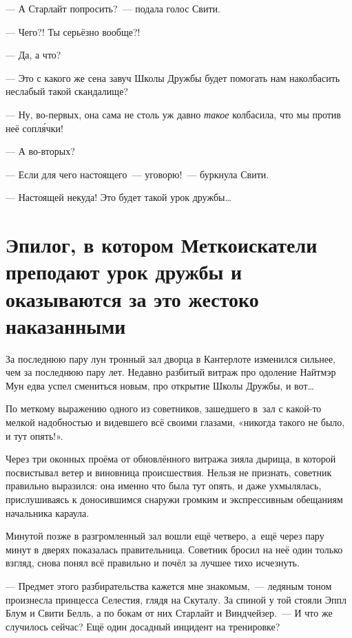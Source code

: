 \documentclass[fontsize=11pt,a5paper,titlepage=firstcover]{scrbook}
\begin{document}
--- А Старлайт попросить?~--- подала голос Свити.

--- Чего?! Ты серьёзно вообще?!

--- Да, а что?

--- Это с какого же сена завуч Школы Дружбы будет помогать нам наколбасить неслабый такой скандалище?

--- Ну, во-первых, она сама не столь уж давно \emph{такое} колбасила, что мы против неё сопля́чки!

--- А во-вторых?

--- Если для чего настоящего~--- уговорю!~--- буркнула Свити.

--- Настоящей некуда! Это будет такой урок дружбы{\ldots}




\chapter*{Эпилог, в котором Меткоискатели преподают урок дружбы и оказываются за это жестоко наказанными}


За последнюю пару лун тронный зал дворца в Кантерлоте изменился сильнее, чем за последнюю пару лет. Недавно разбитый витраж про одоление Найтмэр Мун едва успел смениться новым, про открытие Школы Дружбы, и вот{\ldots}

По меткому выражению одного из советников, зашедшего в~зал с какой-то мелкой надобностью и видевшего всё своими глазами, «никогда такого не было, и тут опять!».

Через три оконных проёма от обновлённого витража зияла дырища, в которой посвистывал ветер и виновница происшествия. Нельзя не признать, советник правильно выразился: она именно что была тут опять, и даже ухмылялась, прислушиваясь к доносившимся снаружи громким и экспрессивным обещаниям начальника караула.

Минутой позже в разгромленный зал вошли ещё четверо, а~ещё через пару минут в дверях показалась правительница. Советник бросил на неё один только взгляд, снова понял всё правильно и почёл за лучшее тихо исчезнуть.

--- Предмет этого разбирательства кажется мне знакомым,~--- ледяным тоном произнесла принцесса Селестия, глядя на Скуталу. За спиной у той стояли Эппл Блум и Свити Белль, а по бокам от них Старлайт и Виндчейзер.~--- И что же случилось сейчас? Ещё один досадный инцидент на тренировке?
\end{document}
